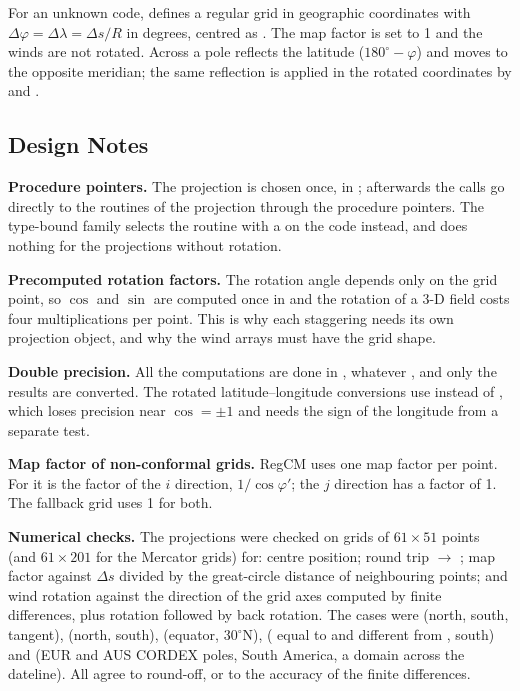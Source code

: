 For an unknown code,  defines a regular grid in geographic
coordinates with $\Delta\varphi = \Delta\lambda = \Delta s/R$ in degrees,
centred as . The map factor is set to 1 and the winds are not
rotated. Across a pole  reflects the latitude
($180^\circ - \varphi$) and moves to the opposite meridian; the same
reflection is applied in the rotated coordinates by  and
.

\subsection{Design Notes}
\label{subsec:proj_design}

\textbf{Procedure pointers.} The projection is chosen once, in
; afterwards the calls go directly to the routines of the
projection through the procedure pointers. The type-bound
 family selects the routine with a 
on the code instead, and does nothing for the projections without
rotation.

\textbf{Precomputed rotation factors.} The rotation angle depends only on
the grid point, so $\cos$ and $\sin$ are computed once in
 and the rotation of a 3-D field costs four
multiplications per point. This is why each staggering needs its own
projection object, and why the wind arrays must have the grid shape.

\textbf{Double precision.} All the computations are done in ,
whatever , and only the results are converted. The rotated
latitude--longitude conversions use  instead of ,
which loses precision near $\cos = \pm1$ and needs the sign of the
longitude from a separate test.

\textbf{Map factor of non-conformal grids.} RegCM uses one map factor per
point. For  it is the factor of the $i$ direction,
$1/\cos\varphi'$; the $j$ direction has a factor of 1. The fallback grid
uses 1 for both.

\textbf{Numerical checks.} The projections were checked on grids of
$61\times51$ points (and $61\times201$ for the Mercator grids) for:
centre position; round trip  $\to$ ; map factor
against $\Delta s$ divided by the great-circle distance of neighbouring
points; and wind rotation against the direction of the grid axes computed
by finite differences, plus rotation followed by back rotation. The cases
were  (north, south, tangent),  (north, south),
 (equator, $30^\circ$N),  ( equal to
and different from , south) and  (EUR and AUS
CORDEX poles, South America, a domain across the dateline). All agree to
round-off, or to the accuracy of the finite differences.

